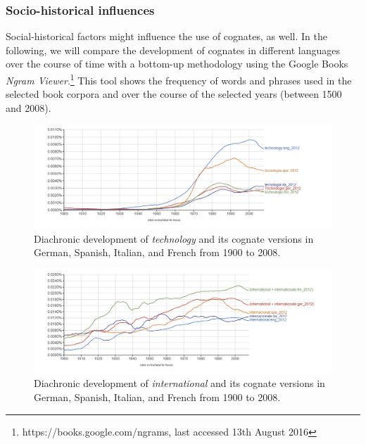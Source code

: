 \documentclass[output=paper]{LSP/langsci}
\begin{document}
\subsubsection{Socio-historical influences}
\label{hansenschirraetal:sec:2.2}

Social-historical factors might influence the use of cognates, as well. In the following, we will compare the development of cognates in different languages over the course of time with a bottom-up methodology using the Google Books \textit{Ngram Viewer}.\footnote{https://books.google.com/ngrams, last accessed 13th August 2016} This tool shows the frequency of words and phrases used in the selected book corpora and over the course of the selected years (between 1500 and 2008).


\begin{figure}
\caption{Diachronic development of \textit{technology} and its cognate versions in German, Spanish, Italian, and French from 1900 to 2008.}
\label{hansenschirraetal:fig:1}
\includegraphics[width=\textwidth]{figures/hansen-schirra/HansenSchirra1.jpg}
\end{figure}

\begin{figure}
\caption{Diachronic development of \textit{international} and its cognate versions in German, Spanish, Italian, and French from 1900 to 2008.}
\label{hansenschirraetal:fig:2}
\includegraphics[width=\textwidth]{figures/hansen-schirra/HansenSchirra2.jpg}
\end{figure}
\end{document}
